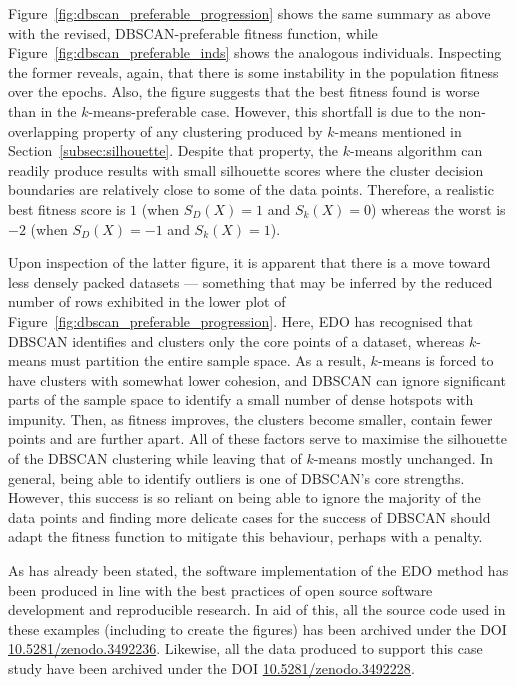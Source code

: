 Figure~\ref{fig:dbscan_preferable_progression} shows the same summary as above
with the revised, DBSCAN-preferable fitness function, while
Figure~\ref{fig:dbscan_preferable_inds} shows the analogous individuals.
Inspecting the former reveals, again, that there is some instability in the
population fitness over the epochs. Also, the figure suggests that the best
fitness found is worse than in the \(k\)-means-preferable case. However, this
shortfall is due to the non-overlapping property of any clustering produced by
\(k\)-means mentioned in Section~\ref{subsec:silhouette}. Despite that property,
the \(k\)-means algorithm can readily produce results with small silhouette
scores where the cluster decision boundaries are relatively close to some of the
data points. Therefore, a realistic best fitness score is \(1\) (when \(S_D(X) =
1\) and \(S_k(X) = 0\)) whereas the worst is \(-2\) (when \(S_D(X) = -1\) and
\(S_k(X) = 1\)).

Upon inspection of the latter figure, it is apparent that there is a move toward
less densely packed datasets --- something that may be inferred by the reduced
number of rows exhibited in the lower plot of
Figure~\ref{fig:dbscan_preferable_progression}. Here, EDO has recognised that
DBSCAN identifies and clusters only the core points of a dataset, whereas
\(k\)-means must partition the entire sample space. As a result, \(k\)-means is
forced to have clusters with somewhat lower cohesion, and DBSCAN can ignore
significant parts of the sample space to identify a small number of dense
hotspots with impunity. Then, as fitness improves, the clusters become smaller,
contain fewer points and are further apart. All of these factors serve to
maximise the silhouette of the DBSCAN clustering while leaving that of
\(k\)-means mostly unchanged. In general, being able to identify outliers is one
of DBSCAN's core strengths. However, this success is so reliant on being able to
ignore the majority of the data points and finding more delicate cases for the
success of DBSCAN should adapt the fitness function to mitigate this behaviour,
perhaps with a penalty.  

As has already been stated, the software implementation of the EDO method has
been produced in line with the best practices of open source software
development and reproducible research. In aid of this, all the source code used
in these examples (including to create the figures) has been archived under the
DOI \href{https://doi.org/10.5281/zenodo.3492236}{10.5281/zenodo.3492236}.
Likewise, all the data produced to support this case study have been archived
under the DOI
\href{https://doi.org/10.5281/zenodo.3492228}{10.5281/zenodo.3492228}.


